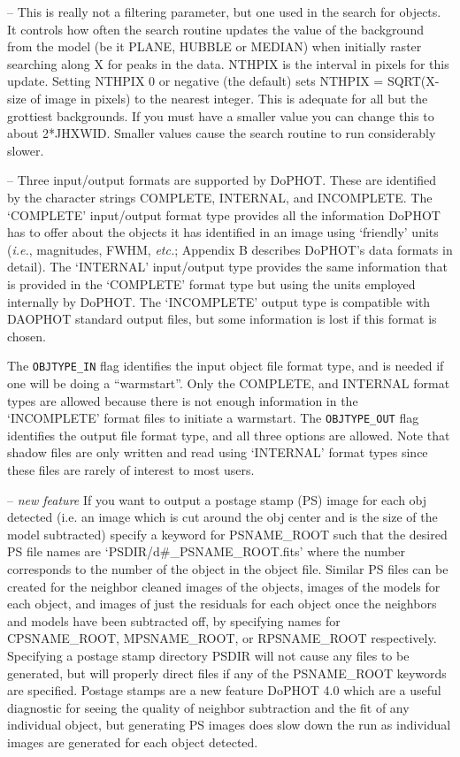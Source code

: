  -- This is really not a filtering parameter, 
but one used in 
the search for objects. It controls how often the search routine updates
the value of the background from the model (be it PLANE, HUBBLE or
MEDIAN) when initially raster searching along X for peaks 
in the data. NTHPIX is the 
interval in pixels for this update. Setting NTHPIX 0 or negative (the
default) sets NTHPIX = SQRT(X-size of image in pixels) to the nearest
integer. This is adequate for all but the grottiest backgrounds.
If you must have a smaller value you can change this to about 2*JHXWID.
Smaller values cause the search routine to run considerably slower.

 -- Three input/output formats are
supported by DoPHOT.  These are identified by the character
strings COMPLETE, INTERNAL, and INCOMPLETE.  The `COMPLETE' input/output
format type provides all the information DoPHOT has to offer about the
objects it has identified in an image using `friendly' units ({\it i.e.},
magnitudes, FWHM, {\it etc.}; Appendix B describes DoPHOT's data formats
in detail).  The 
`INTERNAL' input/output type provides the same information that is
provided in the `COMPLETE' format type but using the 
units employed internally by DoPHOT.
The `INCOMPLETE' output type is
compatible with DAOPHOT standard output files, but some information 
is lost if this format is chosen.  

The {\tt OBJTYPE\_IN}
flag identifies the input object file format type, and is needed if one
will be doing a ``warmstart''.
Only the COMPLETE, and INTERNAL format
types are allowed because there is not enough information in 
the  `INCOMPLETE' format files to initiate a warmstart.  The
{\tt OBJTYPE\_OUT} flag identifies the output file format type, and
all three options are allowed.  Note that shadow files 
are only written and read using `INTERNAL' format types
since these files are rarely of interest to most users.

 -- {\it new feature} If you want to 
output a postage stamp (PS) image for each obj detected (i.e. an image 
which is cut around the obj center and is the size of the model subtracted) 
specify a keyword for PSNAME\_ROOT such that the desired PS file names 
are `PSDIR/d\#\_PSNAME\_ROOT.fits' 
where the number corresponds to the number of the object in the object 
file.  Similar PS files can be created for the neighbor cleaned images of 
the objects, images of the models for each object, and images of just the 
residuals for each object once the neighbors and models have been 
subtracted off, by 
specifying names for CPSNAME\_ROOT, MPSNAME\_ROOT, or 
RPSNAME\_ROOT respectively.  Specifying a postage stamp directory 
PSDIR will not cause any files to be generated, but will properly direct files 
if any of the PSNAME\_ROOT keywords are specified. Postage stamps are 
a new feature DoPHOT 4.0 which are a useful diagnostic for seeing the 
quality of neighbor subtraction and the fit of any individual object, but 
generating PS images does slow down the run as individual images are 
generated for each object detected.

